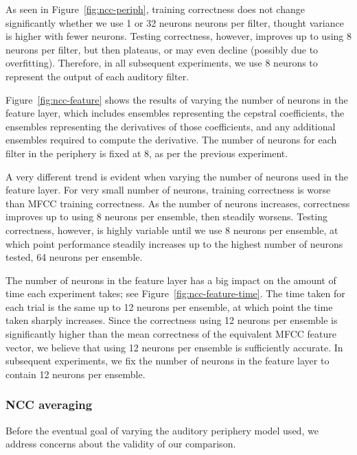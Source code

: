 As seen in Figure~\ref{fig:ncc-periph},
training correctness
does not change significantly
whether we use
1 or 32 neurons neurons per filter,
thought variance is higher
with fewer neurons.
Testing correctness,
however, improves up to
using 8 neurons per filter,
but then plateaus,
or may even decline
(possibly due to overfitting).
Therefore, in all
subsequent experiments,
we use 8 neurons to represent
the output of each auditory filter.


Figure~\ref{fig:ncc-feature} shows the results
of varying the number of neurons
in the feature layer,
which includes ensembles
representing the cepstral coefficients,
the ensembles representing
the derivatives of those coefficients,
and any additional ensembles required
to compute the derivative.
The number of neurons for each filter
in the periphery is fixed at 8,
as per the previous experiment.

A very different trend is evident
when varying the number of neurons
used in the feature layer.
For very small number of neurons,
training correctness is worse
than MFCC training correctness.
As the number of neurons increases,
correctness improves up to
using 8 neurons per ensemble,
then steadily worsens.
Testing correctness, however,
is highly variable until
we use 8 neurons per ensemble,
at which point performance
steadily increases up to
the highest number of neurons tested,
64 neurons per ensemble.


The number of neurons in the feature layer
has a big impact on the amount of time
each experiment takes;
see Figure~\ref{fig:ncc-feature-time}.
The time taken for each trial
is the same up to 12 neurons per ensemble,
at which point
the time taken sharply increases.
Since the correctness using 12 neurons per ensemble
is significantly higher than
the mean correctness of the equivalent MFCC feature vector,
we believe that using 12 neurons per ensemble
is sufficiently accurate.
In subsequent experiments,
we fix the number of neurons
in the feature layer to contain
12 neurons per ensemble.

\subsubsection{NCC averaging}

Before the eventual goal of
varying the auditory periphery model used,
we address concerns about the validity
of our comparison.

